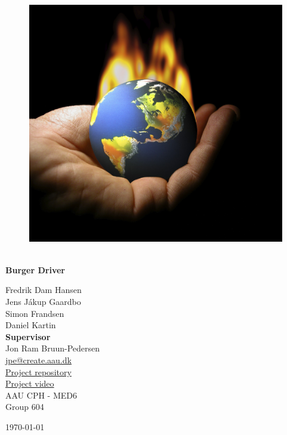 \begin{titlepage}
			
\addtolength{\voffset}{2cm}

\begin{figure}[H]
\centering
\vspace{2cm}	%
\includegraphics[width=0.8\linewidth]{figure/Frontpage/frontpage}
\end{figure}

\mbox{}
\vfill
\renewcommand{\familydefault}{\sfdefault} \normalfont %
\HRule\\[0.1cm]
\textbf{{{\Huge Burger Driver}}} \hspace{0.15cm}\\
\HRule\smallskip{}
\begin{multicols}{2}
{\Large Fredrik Dam Hansen\\Jens Jákup Gaardbo\\Simon Frandsen\\Daniel Kartin\columnbreak}\\
\setlength{\parskip}{2.4cm}
{\Large{\textbf{Supervisor}\\Jon Ram Bruun-Pedersen\\\href{mailto:jpe@create.aau.dk}{\color{blue}jpe@create.aau.dk}}}\medskip\\
\href{https://github.com/roadmandam/medialogyp6}{\color{blue}Project repository}\\
\href{https://www.youtube.com/watch?v=Rl-HKPNP9ZY}{\color{blue}Project video}\medskip
\\\small AAU CPH - 
MED6 \\
Group 604\\
\end{multicols}
\today
\renewcommand{\familydefault}{\rmdefault} \normalfont %
\end{titlepage}


